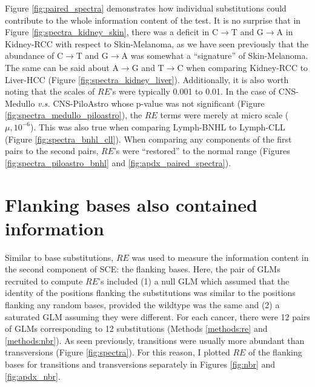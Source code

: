 Figure \ref{fig:paired_spectra} demonstrates how individual substitutions could contribute to the whole information content of the test. It is no surprise that in Figure \ref{fig:spectra_kidney_skin}, there was a deficit in C$\rightarrow$T and G$\rightarrow$A in Kidney-RCC with respect to Skin-Melanoma, as we have seen previously that the abundance of C$\rightarrow$T and G$\rightarrow$A was somewhat a ``signature'' of Skin-Melanoma. The same can be said about A$\rightarrow$G and T$\rightarrow$C when comparing Kidney-RCC to Liver-HCC (Figure \ref{fig:spectra_kidney_liver}). Additionally, it is also worth noting that the scales of $RE$'s were typically 0.001 to 0.01. In the case of CNS-Medullo \textit{v.s.} CNS-PiloAstro whose p-value was not significant (Figure \ref{fig:spectra_medullo_piloastro}), the $RE$ terms were merely at micro scale ($\mu, 10^{-6}$). This was also true when comparing Lymph-BNHL to Lymph-CLL (Figure \ref{fig:spectra_bnhl_cll}). When comparing any components of the first pairs to the second pairs, $RE$'s were ``restored'' to the normal range (Figures \ref{fig:spectra_piloastro_bnhl} and \ref{fig:apdx_paired_spectra}).



\section{Flanking bases also contained information}\label{sce:nbr}
Similar to base substitutions, $RE$ was used to measure the information content in the second component of SCE: the flanking bases. Here, the pair of GLMs recruited to compute $RE$'s included (1) a null GLM which assumed that the identity of the positions flanking the substitutions was similar to the positions flanking any random bases, provided the wildtype was the same and (2) a saturated GLM assuming they were different. For each cancer, there were 12 pairs of GLMs corresponding to 12 substitutions (Methods \ref{methods:re} and \ref{methods:nbr}). As seen previously, transitions were usually more abundant than transversions (Figure \ref{fig:spectra}). For this reason, I plotted $RE$ of the flanking bases for transitions and transversions separately in Figures \ref{fig:nbr} and \ref{fig:apdx_nbr}. 



